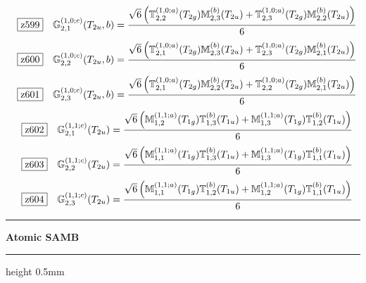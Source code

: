 \documentclass[fleqn,10pt,landscape]{jsarticle}
\begin{document}
\begin{dmath*}
\hspace*{3mm}\fbox{z599}\quad \mathbb{G}_{2,1}^{(1,0;c)}(T_{2u},b)=\frac{\sqrt{6} \left(\mathbb{T}_{2,2}^{(1,0;a)}(T_{2g}) \mathbb{M}_{2,3}^{(b)}(T_{2u}) + \mathbb{T}_{2,3}^{(1,0;a)}(T_{2g}) \mathbb{M}_{2,2}^{(b)}(T_{2u})\right)}{6}
\end{dmath*}
\begin{dmath*}
\hspace*{3mm}\fbox{z600}\quad \mathbb{G}_{2,2}^{(1,0;c)}(T_{2u},b)=\frac{\sqrt{6} \left(\mathbb{T}_{2,1}^{(1,0;a)}(T_{2g}) \mathbb{M}_{2,3}^{(b)}(T_{2u}) + \mathbb{T}_{2,3}^{(1,0;a)}(T_{2g}) \mathbb{M}_{2,1}^{(b)}(T_{2u})\right)}{6}
\end{dmath*}
\begin{dmath*}
\hspace*{3mm}\fbox{z601}\quad \mathbb{G}_{2,3}^{(1,0;c)}(T_{2u},b)=\frac{\sqrt{6} \left(\mathbb{T}_{2,1}^{(1,0;a)}(T_{2g}) \mathbb{M}_{2,2}^{(b)}(T_{2u}) + \mathbb{T}_{2,2}^{(1,0;a)}(T_{2g}) \mathbb{M}_{2,1}^{(b)}(T_{2u})\right)}{6}
\end{dmath*}
\begin{dmath*}
\hspace*{3mm}\fbox{z602}\quad \mathbb{G}_{2,1}^{(1,1;c)}(T_{2u})=\frac{\sqrt{6} \left(\mathbb{M}_{1,2}^{(1,1;a)}(T_{1g}) \mathbb{T}_{1,3}^{(b)}(T_{1u}) + \mathbb{M}_{1,3}^{(1,1;a)}(T_{1g}) \mathbb{T}_{1,2}^{(b)}(T_{1u})\right)}{6}
\end{dmath*}
\begin{dmath*}
\hspace*{3mm}\fbox{z603}\quad \mathbb{G}_{2,2}^{(1,1;c)}(T_{2u})=\frac{\sqrt{6} \left(\mathbb{M}_{1,1}^{(1,1;a)}(T_{1g}) \mathbb{T}_{1,3}^{(b)}(T_{1u}) + \mathbb{M}_{1,3}^{(1,1;a)}(T_{1g}) \mathbb{T}_{1,1}^{(b)}(T_{1u})\right)}{6}
\end{dmath*}
\begin{dmath*}
\hspace*{3mm}\fbox{z604}\quad \mathbb{G}_{2,3}^{(1,1;c)}(T_{2u})=\frac{\sqrt{6} \left(\mathbb{M}_{1,1}^{(1,1;a)}(T_{1g}) \mathbb{T}_{1,2}^{(b)}(T_{1u}) + \mathbb{M}_{1,2}^{(1,1;a)}(T_{1g}) \mathbb{T}_{1,1}^{(b)}(T_{1u})\right)}{6}
\end{dmath*}
\vspace{5mm}

\vspace{5mm}
\noindent \rule[0.5mm]{5mm}{0.5mm}\hspace{3mm}\textbf{Atomic SAMB}\hspace{3mm}\leaders\hrule height 0.5mm\hfill\kern0pt
\vspace{3mm}
\end{document}
